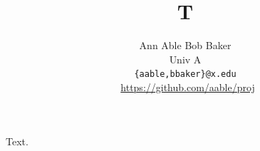 \documentclass{article}
\title{T}
\author{Ann Able \qquad Bob Baker \\ Univ A\\ \small \texttt{\{aable,bbaker\}@x.edu} \\ \faGithub \, \href{https://github.com/aable/proj} {\textsf{\small https://github.com/aable/proj}}}
\begin{document}
\maketitle
Text.
\end{document}

